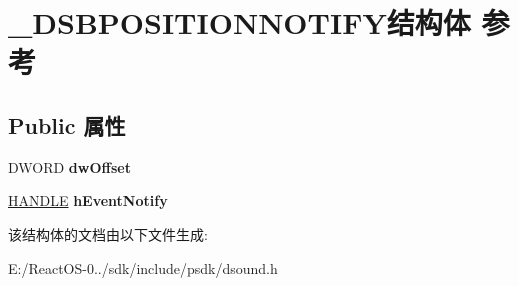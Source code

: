 \hypertarget{struct___d_s_b_p_o_s_i_t_i_o_n_n_o_t_i_f_y}{}\section{\+\_\+\+D\+S\+B\+P\+O\+S\+I\+T\+I\+O\+N\+N\+O\+T\+I\+F\+Y结构体 参考}
\label{struct___d_s_b_p_o_s_i_t_i_o_n_n_o_t_i_f_y}
\subsection*{Public 属性}
\begin{DoxyCompactItemize}
\item 
\mbox{\label{struct___d_s_b_p_o_s_i_t_i_o_n_n_o_t_i_f_y_a331f7394fae18a74b52287e0113cfc98}} 
D\+W\+O\+RD {\bfseries dw\+Offset}
\item 
\mbox{\label{struct___d_s_b_p_o_s_i_t_i_o_n_n_o_t_i_f_y_ad6aec8782b91448424dcdcf252218ef1}} 
\hyperlink{interfacevoid}{H\+A\+N\+D\+LE} {\bfseries h\+Event\+Notify}
\end{DoxyCompactItemize}


该结构体的文档由以下文件生成\+:\begin{DoxyCompactItemize}
\item 
E\+:/\+React\+O\+S-\/0../sdk/include/psdk/dsound.\+h\end{DoxyCompactItemize}
